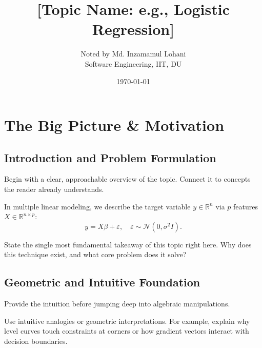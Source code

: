 \documentclass[11pt,a4paper,oneside]{book}
\title{\Huge\bfseries [Topic Name: e.g., Logistic Regression]\\[0.2em]}
\author{Noted by Md. Inzamamul Lohani\\
Software Engineering, IIT, DU}
\date{\today}
\newcommand{\RR}{\mathbb{R}}
\begin{document}
\hypersetup{pageanchor=false}
\maketitle
\hypersetup{pageanchor=true}

\frontmatter
\tableofcontents

\mainmatter

\chapter{The Big Picture \& Motivation}

\section{Introduction and Problem Formulation}
Begin with a clear, approachable overview of the topic. Connect it to concepts the reader already understands.

In multiple linear modeling, we describe the target variable $y \in \RR^n$ via $p$ features $X \in \RR^{n \times p}$:
\begin{equation}
  y = X\beta + \varepsilon, \quad \varepsilon \sim \mathcal{N}(0, \sigma^2 I).
\end{equation}

\begin{keyidea}[title=Core concept]
State the single most fundamental takeaway of this topic right here. Why does this technique exist, and what core problem does it solve?
\end{keyidea}

\section{Geometric and Intuitive Foundation}
Provide the intuition before jumping deep into algebraic manipulations.

\begin{intuition}[title=Visualizing the behavior]
Use intuitive analogies or geometric interpretations. For example, explain why level curves touch constraints at corners or how gradient vectors interact with decision boundaries.
\end{intuition}
\end{document}
